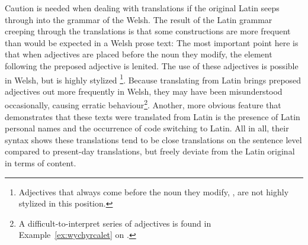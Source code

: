 Caution is needed when dealing with translations if the  original Latin seeps through into the grammar of the Welsh.
The result of the Latin grammar creeping through the translations is that some constructions are more frequent than would be expected in a Welsh prose text:
The most important point here is that when adjectives are placed before the noun they modify, the element following the preposed adjective is lenited.
The use of these adjectives is possible in Welsh, but is highly stylized%
\footnote{Adjectives that always come before the noun they modify, \eg {}, are not highly stylized in this position.}.
Because translating from Latin brings preposed adjectives out more frequently in Welsh, they may have been misunderstood occasionally, causing erratic behaviour\footnote{A difficult-to-interpret series of adjectives is found in Example~\ref{ex:wychyrcalet} on .}.
Another, more obvious feature that demonstrates that  these texts were translated from Latin is the presence of Latin personal names and the occurrence of code switching to Latin.  
All in all, their syntax shows these translations tend to be close translations on the sentence level compared to present-day translations, but freely deviate from the Latin original in terms of content. 

